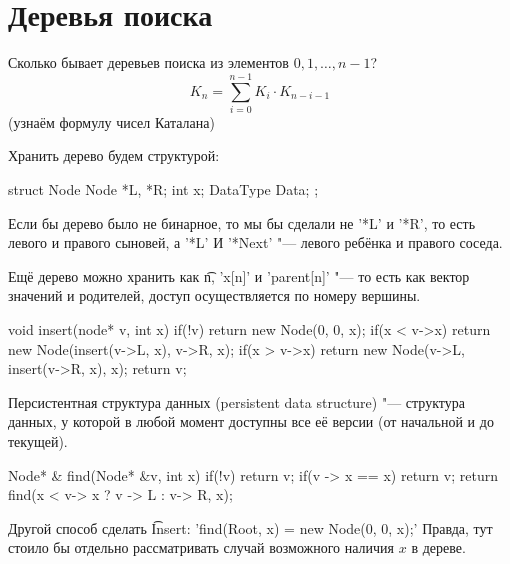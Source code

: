 \chapter{Деревья поиска}
Сколько бывает деревьев поиска из элементов $0, 1, \ldots, n - 1$?
\[ K_{n} = \sum_{i = 0}^{n -1} K_{i} \cdot K_{n - i - 1} \]
(узнаём формулу чисел Каталана)

Хранить дерево будем структурой:
\begin{cppcode}
struct Node {
	Node *L, *R;
	int x;
	DataType Data;
};
\end{cppcode}

\begin{Rem}
	Если бы дерево было не бинарное, то мы бы сделали не \cpp'*L' и \cpp'*R',
	то есть левого и правого сыновей, а \cpp'*L' И \cpp'*Next' "--- 
	левого ребёнка  и правого соседа.
\end{Rem}

\begin{Rem}
	Ещё дерево можно хранить как \t{n}, \cpp'x[n]' и \cpp'parent[n]' "--- то есть 
	как вектор значений и родителей, доступ осуществляется по номеру вершины.
\end{Rem}

\begin{cppcode}
void insert(node* v, int x) {
	if(!v)
		return new Node(0, 0, x);
	 if(x < v->x)
		return new Node(insert(v->L, x), v->R, x);
	if(x > v->x)
		return new Node(v->L, insert(v->R, x), x);
	return v;
}
\end{cppcode}

\begin{Def}
	Персистентная структура данных (persistent data structure) "--- 
	структура данных, у которой в любой момент доступны все её версии 
	(от начальной и до текущей).
\end{Def}

\begin{cppcode}
Node* & find(Node* &v, int x) {
	if(!v)
		return v;
	if(v -> x == x)
		return v;
	return find(x < v-> x ? v -> L : v-> R, x);
}
\end{cppcode}

\begin{Rem}
	Другой способ сделать \t{Insert}: \cpp'find(Root, x) = new Node(0, 0, x);'
	Правда, тут стоило бы отдельно рассматривать случай возможного наличия $x$ в дереве.
\end{Rem}

